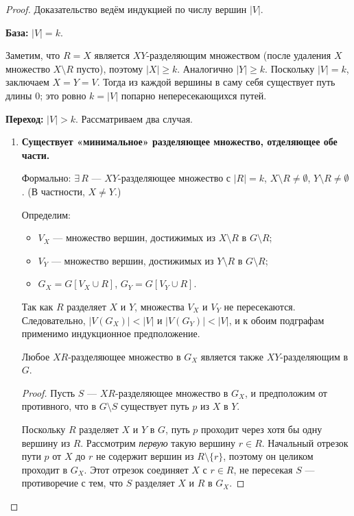 \begin{proof}
	Доказательство ведём индукцией по числу вершин $|V|$.
	
	\medskip
	\noindent\textbf{База:} $|V| = k$.
	
	Заметим, что $R = X$ является $XY$-разделяющим множеством
	(после удаления $X$ множество $X \setminus R$ пусто),
	поэтому $|X| \geq k$. Аналогично $|Y| \geq k$.
	Поскольку $|V| = k$, заключаем $X = Y = V$.
	Тогда из каждой вершины в саму себя существует путь длины $0$;
	это ровно $k = |V|$ попарно непересекающихся путей. \checkmark
	
	\medskip
	\noindent\textbf{Переход:} $|V| > k$. Рассматриваем два случая.
	
	\begin{enumerate}
		\item \textbf{Существует «минимальное» разделяющее множество,
			отделяющее обе части.}
		
		Формально: $\exists\, R$ --- $XY$-разделяющее множество с
		$|R| = k$, $X \setminus R \neq \emptyset$,
		$Y \setminus R \neq \emptyset$.
		(В частности, $X \neq Y$.)
		
		\medskip
		Определим:
		\begin{itemize}
			\item $V_X$ --- множество вершин, достижимых из $X \setminus R$
			в $G \setminus R$;
			\item $V_Y$ --- множество вершин, достижимых из $Y \setminus R$
			в $G \setminus R$;
			\item $G_X = G[V_X \cup R]$, \quad $G_Y = G[V_Y \cup R]$.
		\end{itemize}
		
		Так как $R$ разделяет $X$ и $Y$, множества $V_X$ и $V_Y$
		не пересекаются. Следовательно, $|V(G_X)| < |V|$ и
		$|V(G_Y)| < |V|$, и к обоим подграфам применимо
		индукционное предположение.
		
		\begin{Statement}{}{}
			Любое $XR$-разделяющее множество в $G_X$ является
			также $XY$-разделяющим в $G$.
		\end{Statement}
		\begin{proof}
			Пусть $S$ --- $XR$-разделяющее множество в $G_X$, и
			предположим от противного, что в $G \setminus S$
			существует путь $p$ из $X$ в $Y$.
			
			Поскольку $R$ разделяет $X$ и $Y$ в $G$, путь $p$
			проходит через хотя бы одну вершину из $R$.
			Рассмотрим \emph{первую} такую вершину $r \in R$.
			Начальный отрезок пути $p$ от $X$ до $r$ не содержит
			вершин из $R \setminus \{r\}$, поэтому он целиком
			проходит в $G_X$.
			Этот отрезок соединяет $X$ с $r \in R$, не пересекая $S$
			--- противоречие с тем, что $S$ разделяет $X$ и $R$ в $G_X$.
		\end{proof}
		

\end{enumerate}
\end{proof}
